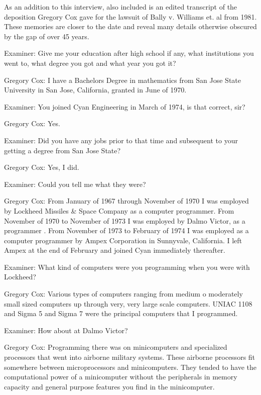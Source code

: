 As an addition to this interview, also included is an edited transcript of the deposition Gregory Cox gave for the lawsuit of Bally v. Williams et. al from 1981. These memories are closer to the date and reveal many details otherwise obscured by the gap of over 45 years.

\noindent\makebox[\linewidth]{\rule{\paperwidth}{0.4pt}}

\textcolor{interviewer}{Examiner:} Give me your education after high school if any, what institutions you went to, what degree you got and what year you got it? 

\textcolor{interviewee}{Gregory Cox:} I have a Bachelors Degree in mathematics from San Jose State University in San Jose, California, granted in June of 1970. 

\textcolor{interviewer}{Examiner:} You joined Cyan Engineering in March of 1974, is that correct, sir? 

\textcolor{interviewee}{Gregory Cox:} Yes. 

\textcolor{interviewer}{Examiner:} Did you have any jobs prior to that time and subsequent to your getting a degree from San Jose State? 

\textcolor{interviewee}{Gregory Cox:} Yes, I did. 

\textcolor{interviewer}{Examiner:} Could you tell me what they were? 

\textcolor{interviewee}{Gregory Cox:} From January of 1967 through November of 1970 I was employed by Lockheed Missiles \& Space Company as a computer programmer. From November of 1970 to November of 1973 I was employed by Dalmo Victor, as a programmer . From November of 1973 to February of 1974 I was employed as a computer programmer by Ampex Corporation in Sunnyvale, California. I left Ampex at the end of February and joined Cyan immediately thereafter. 

\textcolor{interviewer}{Examiner:} What kind of computers were you programming when you were with Lockheed? 

\textcolor{interviewee}{Gregory Cox:} Various types of computers ranging from medium o moderately small sized computers up through very, very large scale computers. UNIAC 1108 and Sigma 5 and Sigma 7 were the principal computers that I programmed. 

\textcolor{interviewer}{Examiner:} How about at Dalmo Victor? 

\textcolor{interviewee}{Gregory Cox:} Programming there was on minicomputers and specialized processors that went into airborne military systems. These airborne processors fit somewhere between microprocessors and minicomputers. They tended to have the computational power of a minicomputer without the peripherals in memory capacity and general purpose features you find in the minicomputer. 

